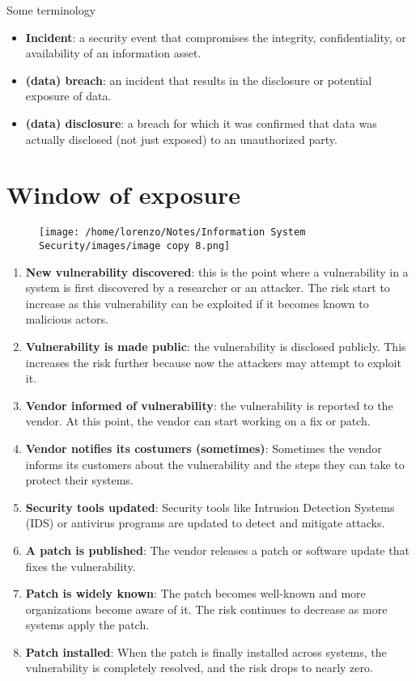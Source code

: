 \begin{quotebox-grey}{Some terminology}
    \begin{itemize}
        \item \textbf{Incident}: a security event that compromises the integrity, confidentiality, or availability of an information asset.
        \item  \textbf{(data) breach}: an incident that results in the disclosure or potential exposure of data. 
        \item \textbf{(data) disclosure}: a breach for which it was confirmed that data was actually disclosed (not just exposed) to an unauthorized party.
    \end{itemize}
\end{quotebox-grey}



\section{Window of exposure}

\begin{figure}[H]
    \centering
    \texttt{[image: /home/lorenzo/Notes/Information System Security/images/image copy 8.png]}
\end{figure}
\begin{enumerate}
    \item \textbf{New vulnerability discovered}: this is the point where a vulnerability in a system is first discovered by a researcher or an attacker. The risk start to increase as this vulnerability can be exploited if it becomes known to malicious actors.
    \item \textbf{Vulnerability is made public}: the vulnerability is disclosed publicly. This increases the risk further because now the attackers may attempt to exploit it. 
    \item \textbf{Vendor informed of vulnerability}: the vulnerability is reported to the vendor. At this point, the vendor can start working on a fix or patch.
    \item \textbf{Vendor notifies its costumers (sometimes)}: Sometimes the vendor informs its customers about the vulnerability and the steps they can take to protect their systems.
    \item \textbf{Security tools updated}: Security tools like Intrusion Detection Systems (IDS) or antivirus programs are updated to detect and mitigate attacks.
    \item \textbf{A patch is published}: The vendor releases a patch or software update that fixes the vulnerability.
    \item \textbf{Patch is widely known}: The patch becomes well-known and more organizations become aware of it. The risk continues to decrease as more systems apply the patch.
    \item \textbf{Patch installed}: When the patch is finally installed across systems, the vulnerability is completely resolved, and the risk drops to nearly zero. 
\end{enumerate}

